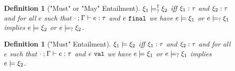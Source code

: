 \documentclass[notheorems]{beamer}
\theoremstyle{slplain}
\numberwithin{thm}{section}
\newtheorem{defn}[thm]{Definition}
\newlength{\sepwid}
\newlength{\onecolwid}
\begin{document}
\begin{frame}[containsverbatim]
\begin{columns}[t]
\begin{column}{\onecolwid}

\end{column} %

\begin{column}{\sepwid}\end{column} %

%
%

\begin{column}{\onecolwid} %



\begin{defn}["Must" or "May" Entailment]
  \label{defn:exhaustiveness}
  $\xi_1 \models_{?}^{\dag} \xi_2$ iff $\xi_1 : \tau$ and $\xi_2 : \tau$ and for all $e$ such that $\cdot \mathbin{;} \Gamma \vdash e : \tau$ and $e ~\mathtt{final}$ we have \textcolor{green}{$e \models \xi_1$} or \textcolor{yellow}{$e \models_{?} \xi_1$} implies \textcolor{green}{$e \models \xi_2$} or \textcolor{yellow}{$e \models_{?} \xi_2$}.
\end{defn}

\begin{defn}["Must" Entailment]
  \label{defn:redundancy}
  $\xi_1 \models \xi_2$ iff $\xi_1 : \tau$ and $\xi_2 : \tau$ and for all $e$ such that $\cdot \mathbin{;} \Gamma \vdash e : \tau$ and $e ~\mathtt{val}$ we have \textcolor{green}{$e \models \xi_1$} or \textcolor{yellow}{$e \models_{?} \xi_1$} implies \textcolor{green}{$e \models \xi_2$}.
\end{defn}


\end{column}
\end{columns}
\end{frame}
\end{document}
